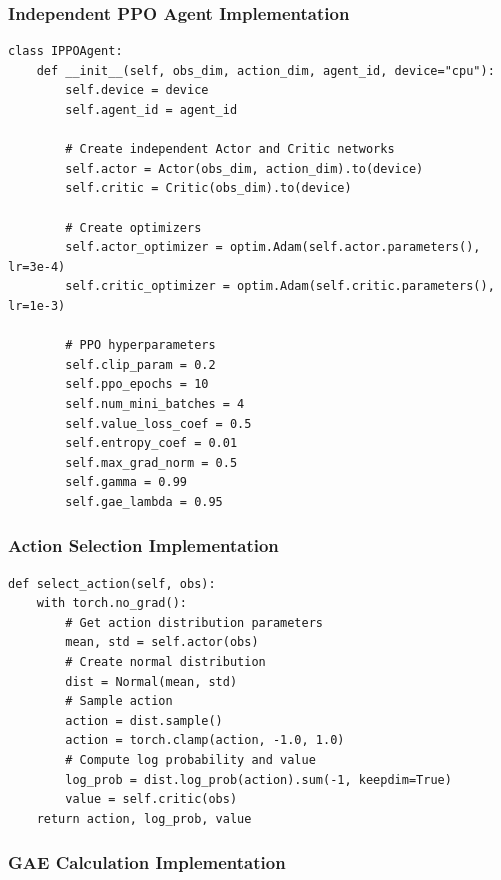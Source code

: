 \documentclass[12pt]{article}
\begin{document}
\subsubsection{Independent PPO Agent Implementation}

\begin{verbatim}
class IPPOAgent:
    def __init__(self, obs_dim, action_dim, agent_id, device="cpu"):
        self.device = device
        self.agent_id = agent_id
        
        # Create independent Actor and Critic networks
        self.actor = Actor(obs_dim, action_dim).to(device)
        self.critic = Critic(obs_dim).to(device)
        
        # Create optimizers
        self.actor_optimizer = optim.Adam(self.actor.parameters(), lr=3e-4)
        self.critic_optimizer = optim.Adam(self.critic.parameters(), lr=1e-3)
        
        # PPO hyperparameters
        self.clip_param = 0.2
        self.ppo_epochs = 10
        self.num_mini_batches = 4
        self.value_loss_coef = 0.5
        self.entropy_coef = 0.01
        self.max_grad_norm = 0.5
        self.gamma = 0.99
        self.gae_lambda = 0.95
\end{verbatim}

\subsubsection{Action Selection Implementation}

\begin{verbatim}
def select_action(self, obs):
    with torch.no_grad():
        # Get action distribution parameters
        mean, std = self.actor(obs)
        # Create normal distribution
        dist = Normal(mean, std)
        # Sample action
        action = dist.sample()
        action = torch.clamp(action, -1.0, 1.0)
        # Compute log probability and value
        log_prob = dist.log_prob(action).sum(-1, keepdim=True)
        value = self.critic(obs)
    return action, log_prob, value
\end{verbatim}

\subsubsection{GAE Calculation Implementation}
\end{document}
